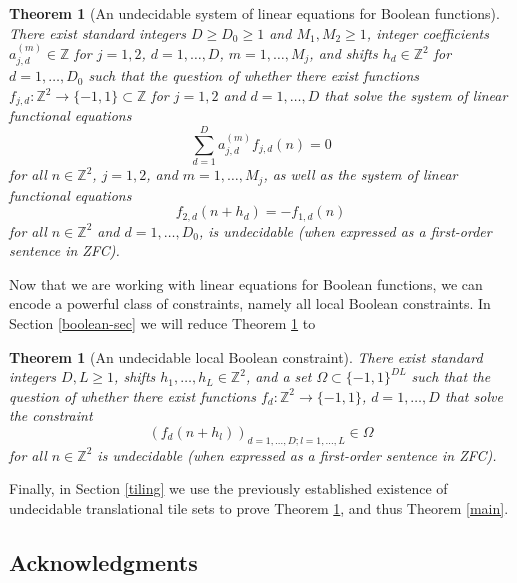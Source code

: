 \documentclass[reqno,a4paper,12pt]{amsart}
\numberwithin{equation}{section}
\numberwithin{figure}{section}
\def\Z{\mathbb{Z}}
\renewcommand\geq{\geqslant}
\theoremstyle{plain}
\newtheorem{theorem}[thm]{Theorem}
\theoremstyle{definition}
\begin{document}
\begin{theorem}[An undecidable system of linear equations for Boolean functions]\label{main-linear}  There exist  standard integers $D \geq D_0 \geq 1$ and $M_1, M_2 \geq 1$, integer coefficients $a_{j,d}^{(m)} \in \Z$ for $j=1,2$, $d=1,\dots,D$, $m=1,\dots,M_j$, and shifts $h_d \in \Z^2$ for $d=1,\dots,D_0$ such that the question of whether there exist functions $f_{j,d} \colon \Z^2 \to \{-1,1\} \subset \Z$ for $j=1,2$ and $d=1,\dots,D$ that solve
the system of linear functional equations
\begin{equation}\label{func-eq-2}
\sum_{d=1}^D a_{j,d}^{(m)} f_{j,d}(n) = 0
\end{equation}
for all $n \in \Z^2$, $j=1,2$, and $m = 1,\dots,M_j$, as well as the system of linear functional equations
\begin{equation}\label{func-eq-3}
f_{2,d}(n+h_d) = - f_{1,d}(n)
\end{equation}
for all $n \in \Z^2$ and $d=1,\dots,D_0$, is undecidable (when expressed as a first-order sentence in ZFC).
\end{theorem}

Now that we are working with linear equations for Boolean functions, we can encode a powerful class of constraints, namely all local Boolean constraints.  In Section \ref{boolean-sec} we will reduce Theorem \ref{main-linear} to

\begin{theorem}[An undecidable local Boolean constraint]\label{main-boolean}  There exist standard integers $D, L \geq 1$, shifts $h_1,\dots,h_L \in \Z^2$, and a set $\Omega \subset \{-1,1\}^{DL}$ such that the question of whether there exist functions $f_d \colon \Z^2 \to \{-1,1\}$, $d=1,\dots,D$ that solve the constraint
\begin{equation}\label{boolean}
(f_d(n+h_l))_{d=1,\dots,D; l=1,\dots,L} \in \Omega 
\end{equation}
for all $n \in \Z^2$ is undecidable (when expressed as a first-order sentence in ZFC).
\end{theorem}

Finally, in Section \ref{tiling} we use the previously established existence of undecidable translational tile sets to prove Theorem \ref{main-boolean}, and thus Theorem \ref{main}.

\subsection{Acknowledgments}
\end{document}

